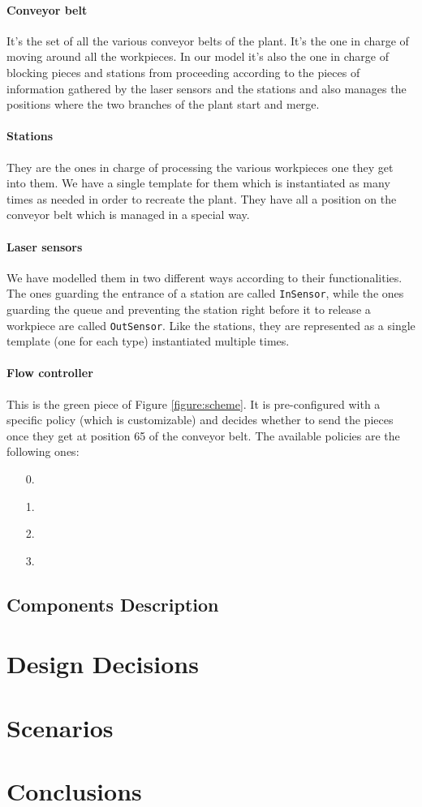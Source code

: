\documentclass[a4paper]{article}
\newcommand{\figureref}[1]{Figure \ref{#1}}
\begin{document}
    \paragraph{Conveyor belt} It's the set of all the various conveyor belts of the plant. It's the one in charge of moving around all the workpieces. In our model it's also the one in charge of blocking pieces and stations from proceeding according to the pieces of information gathered by the laser sensors and the stations and also manages the positions where the two branches of the plant start and merge.

    \paragraph{Stations} They are the ones in charge of processing the various workpieces one they get into them. We have a single template for them which is instantiated as many times as needed in order to recreate the plant. They have all a position on the conveyor belt which is managed in a special way.

    \paragraph{Laser sensors} We have modelled them in two different ways according to their functionalities. The ones guarding the entrance of a station are called \texttt{InSensor}, while the ones guarding the queue and preventing the station right before it to release a workpiece are called \texttt{OutSensor}. Like the stations, they are represented as a single template (one for each type) instantiated multiple times.

    \paragraph{Flow controller} This is the green piece of \figureref{figure:scheme}. It is pre-configured with a specific policy (which is customizable) and decides whether to send the pieces once they get at position 65 of the conveyor belt. The available policies are the following ones:
    \begin{enumerate}
        \item[0.] %
        \item[1.] %
        \item[2.] %
        \item[3.] %
    \end{enumerate}

    \subsection{Components Description}

    \section{Design Decisions} \label{section:design_decisions}

    \section{Scenarios}

    \section{Conclusions}
\end{document}
